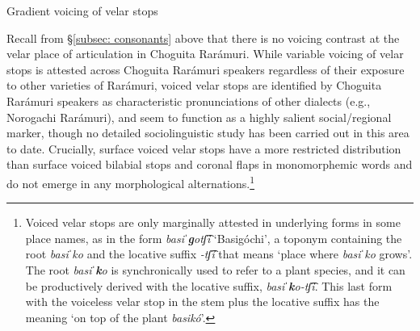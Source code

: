 \ea\label{ex: gradient voicing of velar stops}
{Gradient voicing of velar stops}

    \z
\z

Recall from §\ref{subsec: consonants} above that there is no voicing contrast at the velar place of articulation in Choguita Rarámuri. While variable voicing of velar stops is attested across Choguita Rarámuri speakers regardless of their exposure to other varieties of Rarámuri, voiced velar stops are identified by Choguita Rarámuri speakers as characteristic pronunciations of other dialects (e.g., Norogachi Rarámuri), and seem to function as a highly salient social/regional marker, though no detailed sociolinguistic study has been carried out in this area to date. Crucially, surface voiced velar stops have a more restricted distribution than surface voiced bilabial stops and coronal flaps in monomorphemic words and do not emerge in any morphological alternations.\footnote{Voiced velar stops are only marginally attested in underlying forms in some place names, as in the form \textit{basiˈ}\textbf{\textit{g}}\textit{otʃ͡i} ‘Basigóchi’, a toponym containing the root \textit{basiˈko} and the locative suffix \textit{{}-tʃ͡í} that means ‘place where \textit{basiˈko} grows’. The root \textit{basiˈ}\textbf{\textit{k}}\textit{o} is synchronically used to refer to a plant species, and it can be productively derived with the locative suffix, \textit{basiˈ}\textbf{\textit{k}}\textit{o-tʃ͡i}. This last form with the voiceless velar stop in the stem plus the locative suffix has the meaning ‘on top of the plant \textit{basikó}’.}

